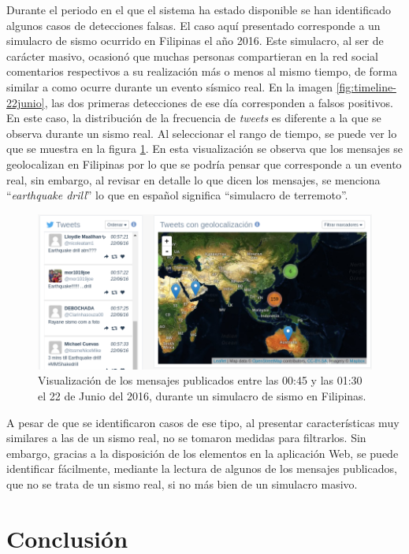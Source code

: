 	Durante el periodo en el que el sistema ha estado disponible se han identificado algunos casos de detecciones falsas. El caso aquí presentado corresponde a un simulacro de sismo ocurrido en Filipinas el año 2016. Este simulacro, al ser de carácter masivo, ocasionó que muchas personas compartieran en la red social comentarios respectivos a su realización más o menos al mismo tiempo, de forma similar a como ocurre durante un evento sísmico real. En la imagen \ref{fig:timeline-22junio}, las dos primeras detecciones de ese día corresponden a falsos positivos. En este caso, la distribución de la frecuencia de \textit{tweets} es diferente a la que se observa durante un sismo real. Al seleccionar el rango de tiempo, se puede ver lo que se muestra en la figura \ref{fig:earthquakedrill}. En esta visualización se observa que los mensajes se geolocalizan en Filipinas por lo que se podría pensar que corresponde a un evento real, sin embargo, al revisar en detalle lo que dicen los mensajes, se menciona ``\textit{earthquake drill}'' lo que en español significa ``simulacro de terremoto''. 
	
	\begin{figure}[h]
	  \centering
	  \includegraphics[width=\textwidth]{imagenes/earthquakedrill.png}
	  \caption{Visualización de los mensajes publicados entre las 00:45 y las 01:30 el 22 de Junio del 2016, durante un simulacro de sismo en Filipinas.}
		\label{fig:earthquakedrill}
	\end{figure}	
	
	A pesar de que se identificaron casos de ese tipo, al presentar características muy similares a las de un sismo real, no se tomaron medidas para filtrarlos. Sin embargo, gracias a la disposición de los elementos en la aplicación Web, se puede identificar fácilmente, mediante la lectura de algunos de los mensajes publicados, que no se trata de un sismo real, si no más bien de un simulacro masivo. 
	
	
\section{Conclusión}
\label{sec:conclusion}

	
